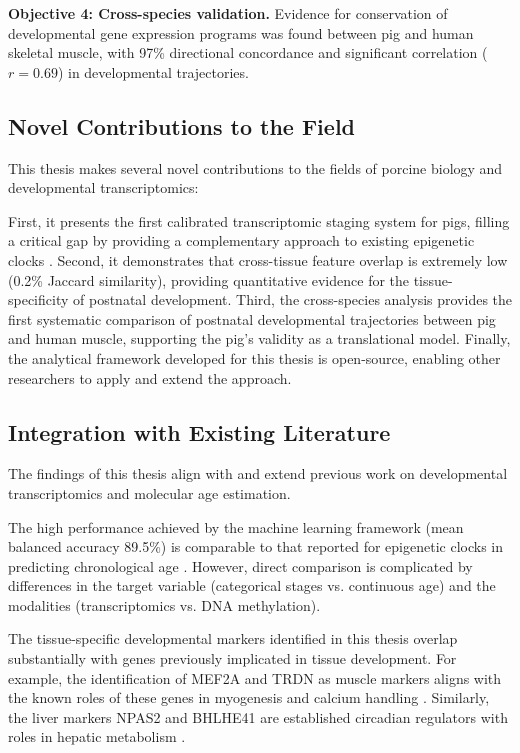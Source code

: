 \textbf{Objective 4: Cross-species validation.} Evidence for conservation of developmental gene expression programs was found between pig and human skeletal muscle, with 97\% directional concordance and significant correlation ($r = 0.69$) in developmental trajectories.

\subsection{Novel Contributions to the Field}

This thesis makes several novel contributions to the fields of porcine biology and developmental transcriptomics:

First, it presents the first calibrated transcriptomic staging system for pigs, filling a critical gap by providing a complementary approach to existing epigenetic clocks \parencite{schachtschneider_epigenetic_2021}. Second, it demonstrates that cross-tissue feature overlap is extremely low (0.2\% Jaccard similarity), providing quantitative evidence for the tissue-specificity of postnatal development. Third, the cross-species analysis provides the first systematic comparison of postnatal developmental trajectories between pig and human muscle, supporting the pig's validity as a translational model. Finally, the analytical framework developed for this thesis is open-source, enabling other researchers to apply and extend the approach.

\subsection{Integration with Existing Literature}

The findings of this thesis align with and extend previous work on developmental transcriptomics and molecular age estimation.

The high performance achieved by the machine learning framework (mean balanced accuracy 89.5\%) is comparable to that reported for epigenetic clocks in predicting chronological age \parencite{horvath_dna_2013}. However, direct comparison is complicated by differences in the target variable (categorical stages vs. continuous age) and the modalities (transcriptomics vs. DNA methylation).

The tissue-specific developmental markers identified in this thesis overlap substantially with genes previously implicated in tissue development. For example, the identification of MEF2A and TRDN as muscle markers aligns with the known roles of these genes in myogenesis and calcium handling \parencite{black_transcriptional_1998, guo_association_1995}. Similarly, the liver markers NPAS2 and BHLHE41 are established circadian regulators with roles in hepatic metabolism \parencite{zhang_night-restricted_2025}.

